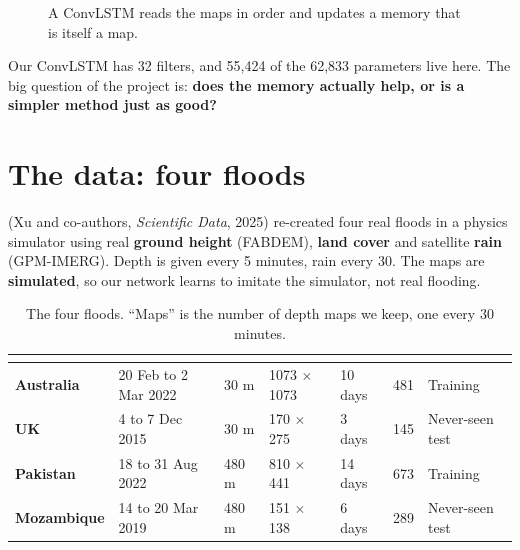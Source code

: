 \begin{figure}[!htbp]
\centering
{}
\caption{A ConvLSTM reads the maps in order and updates a memory that is itself a map.}
\end{figure}

Our ConvLSTM has 32 filters, and 55,424 of the 62,833 parameters live here. The big question of the project is: \textbf{does the memory actually help, or is a simpler method just as good?}

\section{The data: four floods}\label{ch:data}

 (Xu and co-authors, \emph{Scientific Data}, 2025) re-created four real floods in a physics simulator using real \textbf{ground height} (FABDEM), \textbf{land cover} and satellite \textbf{rain} (GPM-IMERG). Depth is given every 5 minutes, rain every 30. The maps are \textbf{simulated}, so our network learns to imitate the simulator, not real flooding.

\begin{table}[!htbp]
\centering\small
\caption{The four floods. ``Maps'' is the number of depth maps we keep, one every 30 minutes.}
\begin{tabularx}{\linewidth}{|>{\bfseries}l|Y|l|l|l|l|Y|}
\hline
{}  &  &  &  &  &  & \\ \hline
Australia & 20 Feb to 2 Mar 2022 & 30 m & 1073 $\times$ 1073 & 10 days & 481 & Training\\ \hline
UK & 4 to 7 Dec 2015 & 30 m & 170 $\times$ 275 & 3 days & 145 & Never-seen test\\ \hline
Pakistan & 18 to 31 Aug 2022 & 480 m & 810 $\times$ 441 & 14 days & 673 & Training\\ \hline
Mozambique & 14 to 20 Mar 2019 & 480 m & 151 $\times$ 138 & 6 days & 289 & Never-seen test\\ \hline
\end{tabularx}
\end{table}

